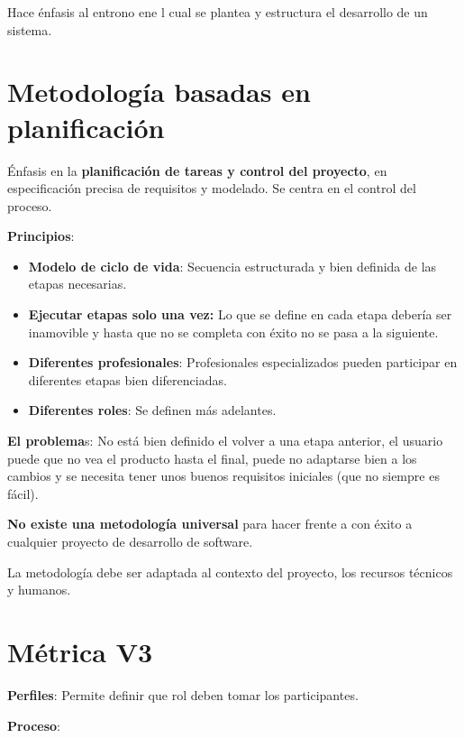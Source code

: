 \documentclass[12pt]{report} %
\begin{document}
Hace énfasis al entrono ene l cual se plantea y estructura el desarrollo
de un sistema.

\section{Metodología basadas en planificación}

Énfasis en la \textbf{planificación de tareas y control del proyecto},
en especificación precisa de requisitos y modelado. Se centra en el
control del proceso.

\textbf{Principios}:

\begin{itemize}

\item
  \textbf{Modelo de ciclo de vida}: Secuencia estructurada y bien
  definida de las etapas necesarias.
\item
  \textbf{Ejecutar etapas solo una vez:} Lo que se define en cada etapa
  debería ser inamovible y hasta que no se completa con éxito no se pasa
  a la siguiente.
\item
  \textbf{Diferentes profesionales}: Profesionales especializados pueden
  participar en diferentes etapas bien diferenciadas.
\item
  \textbf{Diferentes roles}: Se definen más adelantes.
\end{itemize}

\textbf{El problema}s: No está bien definido el volver a una etapa
anterior, el usuario puede que no vea el producto hasta el final, puede
no adaptarse bien a los cambios y se necesita tener unos buenos
requisitos iniciales (que no siempre es fácil).

\textbf{No existe una metodología universal} para hacer frente a con
éxito a cualquier proyecto de desarrollo de software.

La metodología debe ser adaptada al contexto del proyecto, los recursos
técnicos y humanos.

\section{Métrica V3}

\textbf{Perfiles}: Permite definir que rol deben tomar los
participantes.

\textbf{Proceso}:
\end{document}
